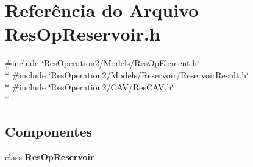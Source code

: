 \section{Referência do Arquivo Res\+Op\+Reservoir.\+h}
\label{_res_op_reservoir_8h}
{\ttfamily \#include \char`\"{}Res\+Operation2/\+Models/\+Res\+Op\+Element.\+h\char`\"{}}\\*
{\ttfamily \#include \char`\"{}Res\+Operation2/\+Models/\+Reservoir/\+Reservoir\+Result.\+h\char`\"{}}\\*
{\ttfamily \#include \char`\"{}Res\+Operation2/\+C\+A\+V/\+Res\+C\+A\+V.\+h\char`\"{}}\\*
\subsection*{Componentes}
\begin{DoxyCompactItemize}
\item 
class {\bf Res\+Op\+Reservoir}
\end{DoxyCompactItemize}
